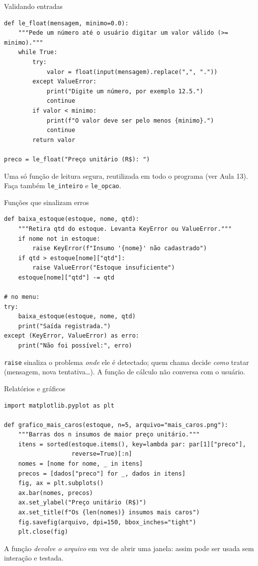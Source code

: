 \documentclass[aspectratio=169,10pt,t]{beamer}
\begin{document}
\begin{frame}[fragile]{Validando entradas}
\begin{lstlisting}[basicstyle=\ttfamily\scriptsize]
def le_float(mensagem, minimo=0.0):
    """Pede um número até o usuário digitar um valor válido (>= minimo)."""
    while True:
        try:
            valor = float(input(mensagem).replace(",", "."))
        except ValueError:
            print("Digite um número, por exemplo 12.5.")
            continue
        if valor < minimo:
            print(f"O valor deve ser pelo menos {minimo}.")
            continue
        return valor

preco = le_float("Preço unitário (R$): ")
\end{lstlisting}
  \small Uma só função de leitura segura, reutilizada em todo o programa (ver Aula 13). Faça também \texttt{le\_inteiro} e \texttt{le\_opcao}.
\end{frame}

\begin{frame}[fragile]{Funções que sinalizam erros}
\begin{lstlisting}[basicstyle=\ttfamily\scriptsize]
def baixa_estoque(estoque, nome, qtd):
    """Retira qtd do estoque. Levanta KeyError ou ValueError."""
    if nome not in estoque:
        raise KeyError(f"Insumo '{nome}' não cadastrado")
    if qtd > estoque[nome]["qtd"]:
        raise ValueError("Estoque insuficiente")
    estoque[nome]["qtd"] -= qtd

# no menu:
try:
    baixa_estoque(estoque, nome, qtd)
    print("Saída registrada.")
except (KeyError, ValueError) as erro:
    print("Não foi possível:", erro)
\end{lstlisting}
  \small \texttt{raise} sinaliza o problema \emph{onde} ele é detectado; quem chama decide \emph{como} tratar (mensagem, nova tentativa\ldots). A função de cálculo não conversa com o usuário.
\end{frame}

\begin{frame}[fragile]{Relatórios e gráficos}
\begin{lstlisting}[basicstyle=\ttfamily\scriptsize]
import matplotlib.pyplot as plt

def grafico_mais_caros(estoque, n=5, arquivo="mais_caros.png"):
    """Barras dos n insumos de maior preço unitário."""
    itens = sorted(estoque.items(), key=lambda par: par[1]["preco"],
                   reverse=True)[:n]
    nomes = [nome for nome, _ in itens]
    precos = [dados["preco"] for _, dados in itens]
    fig, ax = plt.subplots()
    ax.bar(nomes, precos)
    ax.set_ylabel("Preço unitário (R$)")
    ax.set_title(f"Os {len(nomes)} insumos mais caros")
    fig.savefig(arquivo, dpi=150, bbox_inches="tight")
    plt.close(fig)
\end{lstlisting}
  \small A função \emph{devolve o arquivo} em vez de abrir uma janela: assim pode ser usada sem interação e testada.
\end{frame}
\end{document}
